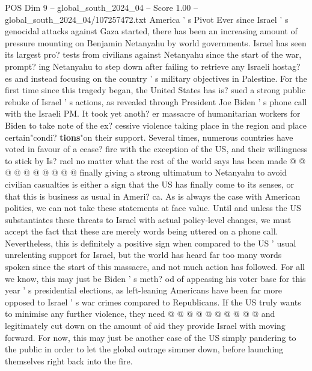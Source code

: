 \begin{textsample}{POS Dim 9 – global\_south\_2024\_04 – Score 1.00 – global\_south\_2024\_04/107257472.txt}  \label{ex:f9_pos_080}
America ' s Pivot Ever since Israel ' s genocidal attacks against Gaza started, there has been an increasing amount of pressure mounting on Benjamin Netanyahu by world governments.
Israel has seen its largest pro? tests from civilians against Netanyahu since the start of the war, prompt? ing Netanyahu to step down after failing to retrieve any Israeli hostag? es and instead focusing on the country ' s military objectives in Palestine.
For the first time since this tragedy began, the United States has is? sued a strong public rebuke of Israel ' s actions, as revealed through President Joe Biden ' s phone call with the Israeli PM.
It took yet anoth? er massacre of humanitarian workers for Biden to take note of the ex? cessive violence taking place in the region and place certain"condi? \textbf{tions}"on their support.
Several times, numerous countries have voted in favour of a cease? fire with the exception of the US, and their willingness to stick by Is? rael no matter what the rest of the world says has been made @ @ @ @ @ @ @ @ @ @ finally giving a strong ultimatum to Netanyahu to avoid civilian casualties is either a sign that the US has finally come to its senses, or that this is business as usual in Ameri? ca.
As is always the case with American politics, we can not take these statements at face value.
Until and unless the US substantiates these threats to Israel with actual policy-level changes, we must accept the fact that these are merely words being uttered on a phone call.
Nevertheless, this is definitely a positive sign when compared to the US ' usual unrelenting support for Israel, but the world has heard far too many words spoken since the start of this massacre, and not much action has followed.
For all we know, this may just be Biden ' s meth? od of appeasing his voter base for this year ' s presidential elections, as left-leaning Americans have been far more opposed to Israel ' s war crimes compared to Republicans.
If the US truly wants to minimise any further violence, they need @ @ @ @ @ @ @ @ @ @ and legitimately cut down on the amount of aid they provide Israel with moving forward.
For now, this may just be another case of the US simply pandering to the public in order to let the global outrage simmer down, before launching themselves right back into the fire.

\end{textsample}
